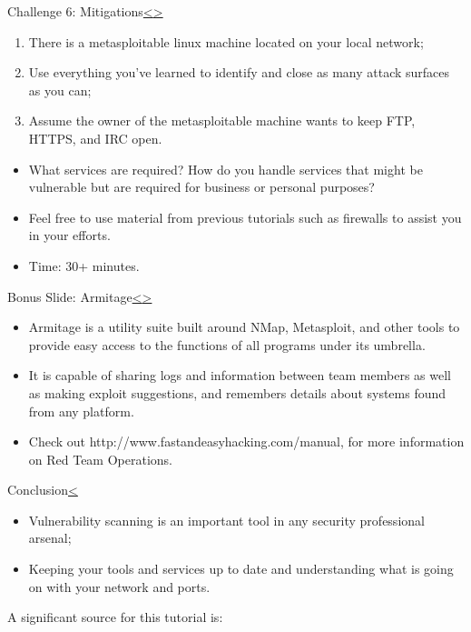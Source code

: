 \documentclass[12pt]{extarticle}
\newenvironment{instructionblock}{\Large\bgroup}{\egroup}
\begin{document}
\pagebreak
\begin{slide}{Challenge 6: Mitigations\cite{b1}}{\hyperref[slide 21]{\textless}\hyperref[slide 23]{\textgreater}}
\vskip 5pt
\begin{instructionblock}
	\begin{enumerate}
	\item There is a metasploitable linux machine located on your local network;
	\item Use everything you've learned to identify and close as many attack surfaces as you can;
	\item Assume the owner of the metasploitable machine wants to keep FTP, HTTPS, and IRC open.
	\end{enumerate}

\end{instructionblock}
\end{slide}
\begin{itemize}
	\item What services are required? How do you handle services that might be vulnerable but are required for business or personal purposes?
	\item Feel free to use material from previous tutorials such as firewalls to assist you in your efforts.
	\item Time: 30+ minutes.
\end{itemize}

\pagebreak
\begin{slide}{Bonus Slide: Armitage\cite{b5}}{\hyperref[slide 22]{\textless}\hyperref[slide 24]{\textgreater}}
	\vskip 5pt
	\begin{instructionblock}
		\begin{itemize}
			\item Armitage is a utility suite built around NMap, Metasploit, and other tools to provide easy access to the functions of all programs under its umbrella.
			\item It is capable of sharing logs and information between team members as well as making exploit suggestions, and remembers details about systems found from any platform.
			\item Check out http://www.fastandeasyhacking.com/manual, for more information on Red Team Operations.
		\end{itemize}
		
	\end{instructionblock}
\end{slide}
\vfill
\pagebreak

\begin{slide}{Conclusion}{\hyperref[slide 23]{\textless}}
	\vskip 5pt
	\begin{instructionblock}
		\begin{itemize}
		\item Vulnerability scanning is an important tool in any security professional arsenal;
		\item Keeping your tools and services up to date and understanding what is going on with your network and ports.
	    \end{itemize}
	\end{instructionblock}
\end{slide}
\vfill
A significant source for this tutorial is: \cite{b1}
\end{document}
